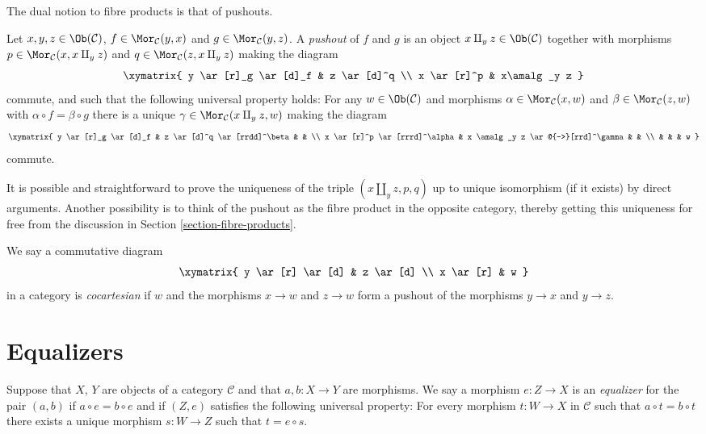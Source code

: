 \noindent
The dual notion to fibre products is that of pushouts.

\begin{definition}
\label{definition-pushouts}
Let $x, y, z\in \Ob(\mathcal{C})$,
$f\in \Mor_\mathcal{C}(y, x)$
and $g\in \Mor_{\mathcal C}(y, z)$.
A {\it pushout} of $f$ and $g$ is
an object $x\amalg_y z\in \Ob(\mathcal{C})$
together with morphisms
$p\in \Mor_{\mathcal C}(x, x\amalg_y z)$ and
$q\in\Mor_{\mathcal C}(z, x\amalg_y z)$ making the diagram
$$
\xymatrix{
y \ar[r]_g \ar[d]_f & z \ar[d]^q \\
x \ar[r]^p & x\amalg_y z
}
$$
commute, and such that the following universal property holds:
For any $w\in \Ob(\mathcal{C})$ and morphisms
$\alpha \in \Mor_{\mathcal C}(x, w)$ and
$\beta \in \Mor_\mathcal{C}(z, w)$ with
$\alpha \circ f = \beta \circ g$ there is a unique
$\gamma\in \Mor_{\mathcal C}(x\amalg_y z, w)$ making
the diagram
$$
\xymatrix{
y \ar[r]_g \ar[d]_f & z \ar[d]^q \ar[rrdd]^\beta & & \\
x \ar[r]^p \ar[rrrd]^\alpha & x \amalg_y z \ar@{-->}[rrd]^\gamma & & \\
& & & w
}
$$
commute.
\end{definition}

\noindent
It is possible and straightforward to prove the uniqueness of the triple
$(x\amalg_y z, p, q)$ up to unique isomorphism (if it exists) by direct
arguments. Another possibility is to think of the pushout as the
fibre product in the opposite category, thereby getting this uniqueness for
free from the discussion in Section \ref{section-fibre-products}.

\begin{definition}
\label{definition-cocartesian}
We say a commutative diagram
$$
\xymatrix{
y \ar[r] \ar[d] & z \ar[d] \\
x \ar[r] & w
}
$$
in a category is {\it cocartesian} if $w$ and the morphisms $x \to w$ and
$z \to w$ form a pushout of the morphisms $y \to x$ and $y \to z$.
\end{definition}


\section{Equalizers}
\label{section-equalizers}

\begin{definition}
\label{definition-equalizers}
Suppose that $X$, $Y$ are objects of a category $\mathcal{C}$
and that $a, b : X \to Y$ are morphisms. We say a morphism
$e : Z \to X$ is an {\it equalizer} for the pair $(a, b)$ if
$a \circ e = b \circ e$ and if $(Z, e)$ satisfies the following
universal property: For every morphism $t : W \to X$
in $\mathcal{C}$ such that $a \circ t = b \circ t$ there exists
a unique morphism $s : W \to Z$ such that $t = e \circ s$.
\end{definition}

